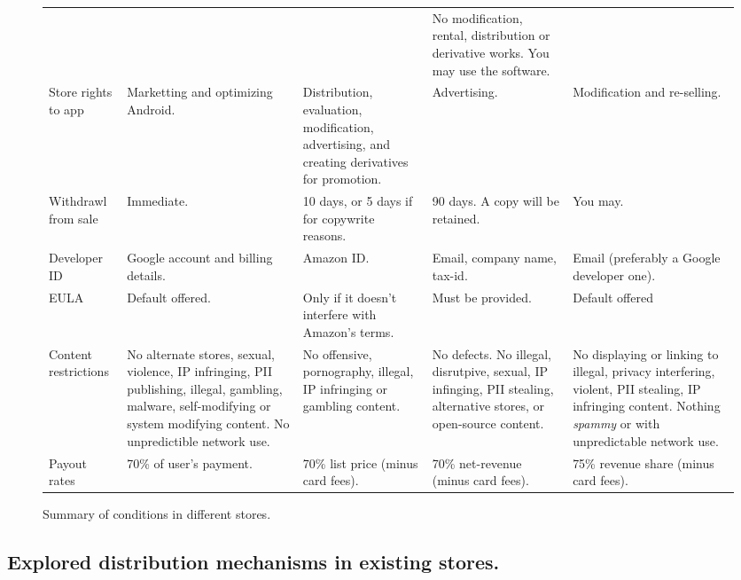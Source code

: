 \documentclass[a4paper]{scrartcl}
\begin{document}
\begin{figure}
\begin{tabulary}{\linewidth}{lLLLL}
               &
               &
               & No modification, rental, distribution or derivative works.  You may use the software. \\
Store rights to app & Marketting and optimizing Android.
                    & Distribution, evaluation, modification, advertising, and creating derivatives for promotion.
                    & Advertising.
                    & Modification and re-selling. \\
Withdrawl from sale & Immediate.
                    & 10 days, or 5 days if for copywrite reasons.
                    & 90 days. A copy will be retained.
                    & You may. \\
Developer ID & Google account and billing details.
             & Amazon ID.
             & Email, company name, tax-id.
             & Email (preferably a Google developer one). \\
EULA & Default offered.
     & Only if it doesn't interfere with Amazon's terms.
     & Must be provided.
     & Default offered \\
Content restrictions & No alternate stores, sexual, violence, IP infringing, PII publishing, illegal, gambling, malware, self-modifying or system modifying content.  No unpredictible network use.
                     & No offensive, pornography, illegal, IP infringing or gambling content.
                     & No defects. No illegal, disrutpive, sexual, IP infinging, PII stealing, alternative stores, or open-source content.
                     & No displaying or linking to illegal, privacy interfering, violent, PII stealing, IP infringing content.  Nothing \emph{spammy} or with unpredictable network use.\\
Payout rates & 70\% of user's payment.
             & 70\% list price (minus card fees).
             & 70\% net-revenue (minus card fees).
             & 75\% revenue share (minus card fees).\\
\bottomrule
\end{tabulary}
\caption{Summary of conditions in different stores.}
\label{tab:terms}
\end{figure}

\subsection{Explored distribution mechanisms in existing stores.}
\end{document}
